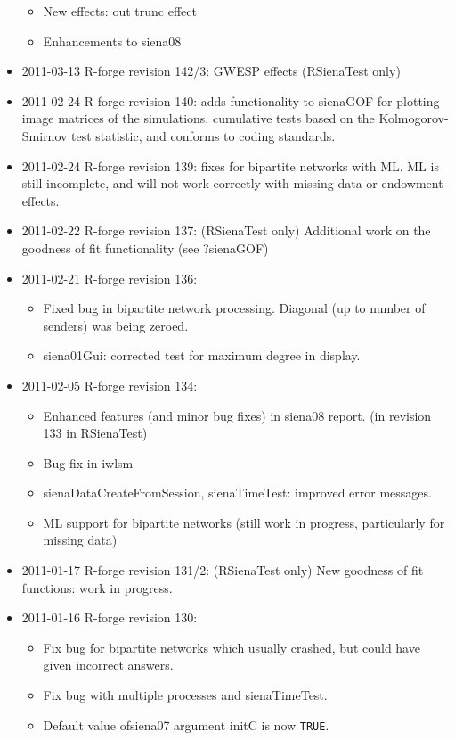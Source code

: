 \documentclass[a4paper,fleqn,11pt]{article}
\newcommand{\+}{\, + \,}
\begin{document}
\begin{small}
\begin{itemize}
\begin{itemize}
\item New effects: out trunc effect
\item Enhancements to siena08
\end{itemize}
\item 2011-03-13 R-forge revision 142/3: GWESP effects (RSienaTest only)
\item 2011-02-24 R-forge revision 140: adds functionality to sienaGOF
  for plotting
  image matrices of the simulations, cumulative tests based on the Kolmogorov-
  Smirnov test statistic, and conforms to coding standards.
\item 2011-02-24 R-forge revision 139: fixes for bipartite networks with
  ML. ML is still incomplete, and will not work correctly with missing data or
  endowment effects.
\item 2011-02-22 R-forge revision 137: (RSienaTest only)
Additional work on the goodness of fit functionality (see ?sienaGOF)
\item 2011-02-21 R-forge revision 136:
\begin{itemize}
\item Fixed bug in bipartite network processing. Diagonal (up to number of
  senders) was being zeroed.
\item siena01Gui: corrected test for maximum degree in display.
\end{itemize}
\item 2011-02-05 R-forge revision 134:
\begin{itemize}
\item Enhanced features (and minor bug fixes) in \textsf{siena08} report. (in revision
  133 in \textsf{RSienaTest})
\item Bug fix in iwlsm
\item sienaDataCreateFromSession, \textsf{sienaTimeTest}: improved error messages.
\item ML support for bipartite networks (still work in progress,
  particularly for missing data)
\end{itemize}
\item 2011-01-17 R-forge revision 131/2: (RSienaTest only)
New goodness of fit functions: work in progress.
\item 2011-01-16 R-forge revision 130:
\begin{itemize}
\item Fix bug for bipartite networks which usually crashed, but could have given
  incorrect answers.
\item Fix bug with multiple processes and \textsf{sienaTimeTest}.
\item Default value of\textsf{siena07} argument initC is now \texttt{TRUE}.

\end{itemize}
\end{itemize}
\end{small}
\end{document}
